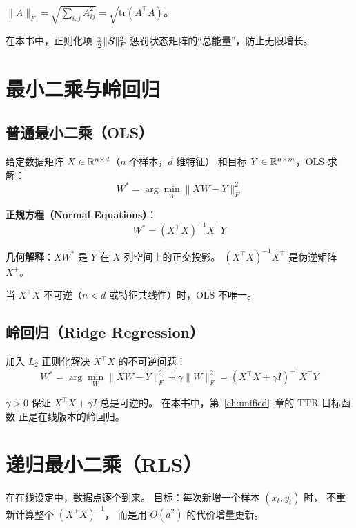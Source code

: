 $\|A\|_F = \sqrt{\sum_{i,j} A_{ij}^2} = \sqrt{\text{tr}(A^\top A)}$。

在本书中，正则化项 $\frac{\gamma}{2}\|\boldsymbol{S}\|_F^2$
惩罚状态矩阵的``总能量''，防止无限增长。

\section{最小二乘与岭回归}
\label{sec:app_regression}

\subsection{普通最小二乘（OLS）}

给定数据矩阵 $X \in \mathbb{R}^{n \times d}$（$n$ 个样本，$d$ 维特征）
和目标 $Y \in \mathbb{R}^{n \times m}$，OLS 求解：
\[
  W^* = \arg\min_W \|XW - Y\|_F^2
\]

\textbf{正规方程（Normal Equations）}：
\begin{equation}
  W^* = (X^\top X)^{-1} X^\top Y
  \label{eq:ols_solution}
\end{equation}

\textbf{几何解释}：$XW^*$ 是 $Y$ 在 $X$ 列空间上的正交投影。
$(X^\top X)^{-1} X^\top$ 是伪逆矩阵 $X^+$。

当 $X^\top X$ 不可逆（$n < d$ 或特征共线性）时，OLS 不唯一。

\subsection{岭回归（Ridge Regression）}

加入 $L_2$ 正则化解决 $X^\top X$ 的不可逆问题：
\begin{equation}
  W^* = \arg\min_W \|XW - Y\|_F^2 + \gamma \|W\|_F^2
  = (X^\top X + \gamma I)^{-1} X^\top Y
  \label{eq:ridge_solution}
\end{equation}

$\gamma > 0$ 保证 $X^\top X + \gamma I$ 总是可逆的。
在本书中，第~\ref{ch:unified}~章的 TTR 目标函数
正是在线版本的岭回归。

\section{递归最小二乘（RLS）}
\label{sec:app_rls}

在在线设定中，数据点逐个到来。
目标：每次新增一个样本 $(x_t, y_t)$ 时，
不重新计算整个 $(X^\top X)^{-1}$，
而是用 $O(d^2)$ 的代价增量更新。

